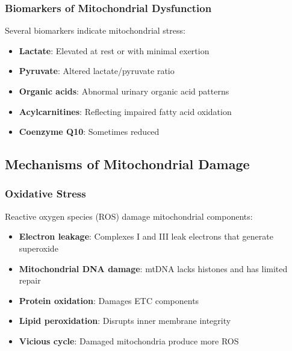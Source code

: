 \subsubsection{Biomarkers of Mitochondrial Dysfunction}

Several biomarkers indicate mitochondrial stress:

\begin{itemize}
    \item \textbf{Lactate}: Elevated at rest or with minimal exertion
    \item \textbf{Pyruvate}: Altered lactate/pyruvate ratio
    \item \textbf{Organic acids}: Abnormal urinary organic acid patterns
    \item \textbf{Acylcarnitines}: Reflecting impaired fatty acid oxidation
    \item \textbf{Coenzyme Q10}: Sometimes reduced
\end{itemize}

\subsection{Mechanisms of Mitochondrial Damage}
\label{sec:mito-damage}

\subsubsection{Oxidative Stress}

Reactive oxygen species (ROS) damage mitochondrial components:

\begin{itemize}
    \item \textbf{Electron leakage}: Complexes I and III leak electrons that generate superoxide
    \item \textbf{Mitochondrial DNA damage}: mtDNA lacks histones and has limited repair
    \item \textbf{Protein oxidation}: Damages ETC components
    \item \textbf{Lipid peroxidation}: Disrupts inner membrane integrity
    \item \textbf{Vicious cycle}: Damaged mitochondria produce more ROS
\end{itemize}





